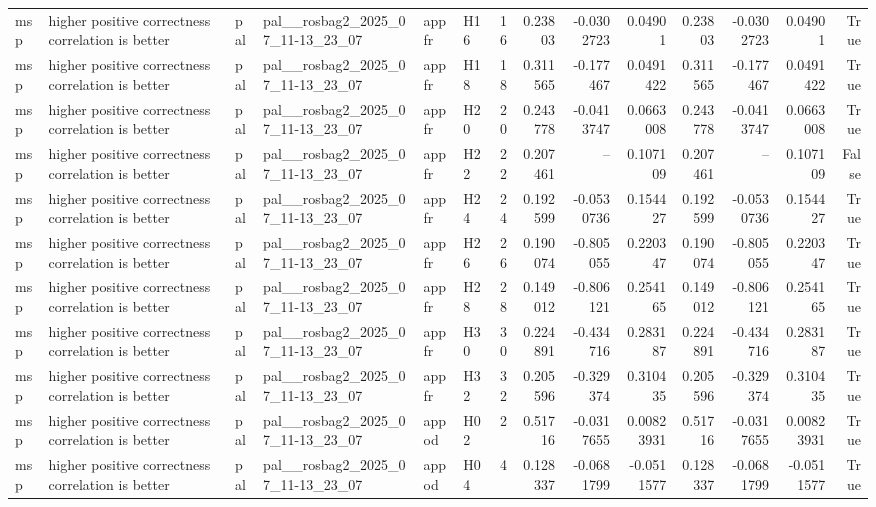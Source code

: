 \begin{longtable}{llllllrrrrrrrr}
msp & higher positive correctness correlation is better & pal & pal\_\_rosbag2\_2025\_07\_11-13\_23\_07 & appfr & H16 & 16 & 0.23803 & -0.0302723 & 0.04901 & 0.23803 & -0.0302723 & 0.04901 & True \\
msp & higher positive correctness correlation is better & pal & pal\_\_rosbag2\_2025\_07\_11-13\_23\_07 & appfr & H18 & 18 & 0.311565 & -0.177467 & 0.0491422 & 0.311565 & -0.177467 & 0.0491422 & True \\
msp & higher positive correctness correlation is better & pal & pal\_\_rosbag2\_2025\_07\_11-13\_23\_07 & appfr & H20 & 20 & 0.243778 & -0.0413747 & 0.0663008 & 0.243778 & -0.0413747 & 0.0663008 & True \\
msp & higher positive correctness correlation is better & pal & pal\_\_rosbag2\_2025\_07\_11-13\_23\_07 & appfr & H22 & 22 & 0.207461 & -- & 0.107109 & 0.207461 & -- & 0.107109 & False \\
msp & higher positive correctness correlation is better & pal & pal\_\_rosbag2\_2025\_07\_11-13\_23\_07 & appfr & H24 & 24 & 0.192599 & -0.0530736 & 0.154427 & 0.192599 & -0.0530736 & 0.154427 & True \\
msp & higher positive correctness correlation is better & pal & pal\_\_rosbag2\_2025\_07\_11-13\_23\_07 & appfr & H26 & 26 & 0.190074 & -0.805055 & 0.220347 & 0.190074 & -0.805055 & 0.220347 & True \\
msp & higher positive correctness correlation is better & pal & pal\_\_rosbag2\_2025\_07\_11-13\_23\_07 & appfr & H28 & 28 & 0.149012 & -0.806121 & 0.254165 & 0.149012 & -0.806121 & 0.254165 & True \\
msp & higher positive correctness correlation is better & pal & pal\_\_rosbag2\_2025\_07\_11-13\_23\_07 & appfr & H30 & 30 & 0.224891 & -0.434716 & 0.283187 & 0.224891 & -0.434716 & 0.283187 & True \\
msp & higher positive correctness correlation is better & pal & pal\_\_rosbag2\_2025\_07\_11-13\_23\_07 & appfr & H32 & 32 & 0.205596 & -0.329374 & 0.310435 & 0.205596 & -0.329374 & 0.310435 & True \\
msp & higher positive correctness correlation is better & pal & pal\_\_rosbag2\_2025\_07\_11-13\_23\_07 & appod & H02 & 2 & 0.51716 & -0.0317655 & 0.00823931 & 0.51716 & -0.0317655 & 0.00823931 & True \\
msp & higher positive correctness correlation is better & pal & pal\_\_rosbag2\_2025\_07\_11-13\_23\_07 & appod & H04 & 4 & 0.128337 & -0.0681799 & -0.0511577 & 0.128337 & -0.0681799 & -0.0511577 & True \\

\end{longtable}
